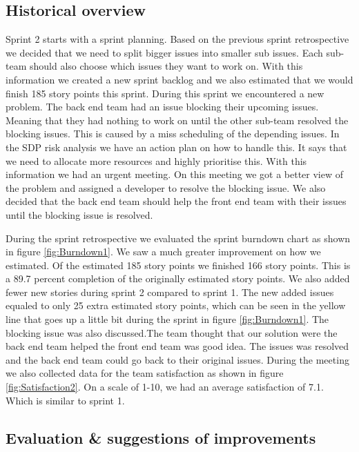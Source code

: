 \documentclass{article}
\begin{document}
\subsection{Historical overview}
Sprint 2 starts with a sprint planning. Based on the previous sprint retrospective we decided that we need to split bigger issues into smaller sub issues.  Each sub-team should also choose which issues they want to work on. With this information we created a new sprint backlog and we also estimated that we would finish 185 story points this sprint. During this sprint we encountered a new problem. The back end team had an issue blocking their upcoming issues. Meaning that they had nothing to work on until the other sub-team resolved the blocking issues. This is caused by a miss scheduling of the depending issues. In the SDP risk analysis we have an action plan on how to handle this. It says that we need to allocate more resources and highly prioritise this. With this information we had an urgent meeting. On this meeting we got a better view of the problem and assigned a developer to resolve the blocking issue. We also decided that the back end team should help the front end team with their issues until the blocking issue is resolved. 

During the sprint retrospective we evaluated the sprint burndown chart as shown in figure \ref{fig:Burndown1}. We saw a much greater improvement on how we estimated. Of the estimated 185 story points we finished 166 story points. This is a 89.7 percent completion of the originally estimated story points. We also added fewer new stories during sprint 2 compared to sprint 1. The new added issues equaled to only 25 extra estimated story points, which can be seen in the yellow line that goes up a little bit during the sprint in figure \ref{fig:Burndown1}. The blocking issue was also discussed.The team thought that our solution were the back end team helped the front end team was good idea. The issues was resolved and the back end team could go back to their original issues. During the meeting we also collected data for the team satisfaction as shown in figure \ref{fig:Satisfaction2}. On a scale of 1-10, we had an average satisfaction of 7.1. Which is similar to sprint 1.

\subsection{Evaluation \& suggestions of improvements}
\end{document}
